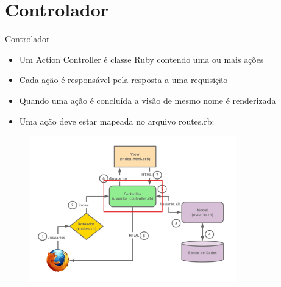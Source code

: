 \section{Controlador}
\begin{frame}{Controlador}
	\begin{itemize}
		\item Um \alert{Action Controller} é classe Ruby contendo uma ou mais ações
		\item Cada \alert{ação} é responsável pela resposta a uma requisição
		\item Quando uma ação é concluída a \alert{visão} de mesmo nome é \alert{renderizada}
		\item Uma ação deve estar \alert{mapeada} no arquivo \alert{routes.rb}:
	\end{itemize}	
	\begin{figure}[h!]
		\centering
		\includegraphics[width=0.80\textwidth]{imagens/mvc-controller.jpg}
	\end{figure}

\end{frame}